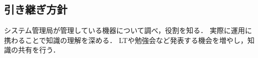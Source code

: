\subsection*{引き継ぎ方針}


システム管理局が管理している機器について調べ，役割を知る．
実際に運用に携わることで知識の理解を深める．
LTや勉強会など発表する機会を増やし，知識の共有を行う．
